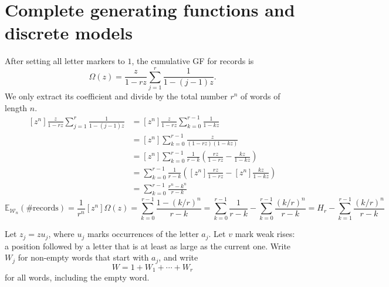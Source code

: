 \section{Complete generating functions and discrete models}
After setting all letter markers to $1$, the cumulative GF for records is
\begin{equation*}
    \Omega(z)=\frac{z}{1-rz}\sum_{j=1}^{r}\frac{1}{1-(j-1)z}.
\end{equation*}
We only extract its coefficient and divide by the total number $r^n$ of words of length $n$.
\begin{equation*}
    \begin{aligned}
        [z^{n}] \frac{z}{1 - rz} \sum_{j = 1}^{r} \frac{1}{1 - (j - 1)z}
        &= [z^{n}] \frac{z}{1 - rz} \sum_{k = 0}^{r - 1} \frac{1}{1 - kz} \\
        &= [z^{n}] \sum_{k = 0}^{r - 1} \frac{z}{(1 - rz)(1 - kz)} \\
        &= [z^{n}] \sum_{k = 0}^{r - 1} \frac{1}{r - k} \left(\frac{rz}{1 - rz} - \frac{kz}{1 - kz} \right) \\
        &= \sum_{k = 0}^{r - 1} \frac{1}{r - k} \left([z^{n}] \frac{rz}{1 - rz} - [z^{n}] \frac{kz}{1 - kz} \right) \\
        &= \sum_{k = 0}^{r - 1} \frac{r^{n} - k^{n}}{r - k}
    \end{aligned}
\end{equation*}
\begin{equation*}
    \mathbb{E}_{\mathcal{W}_{n}}(\#\text{records})
    = \frac{1}{r^n}[z^n]\Omega(z)
    = \sum_{k = 0}^{r - 1} \frac{1 - (k/r)^{n}}{r - k}
    = \sum_{k = 0}^{r - 1} \frac{1}{r - k} - \sum_{k = 0}^{r - 1} \frac{(k/r)^{n}}{r - k}
    = H_{r} - \sum_{k = 1}^{r - 1} \frac{(k/r)^{n}}{r - k}
\end{equation*}


Let $z_j=zu_j$, where $u_j$ marks occurrences of the letter $a_j$. Let $v$ mark weak rises:
a position followed by a letter that is at least as large as the current one. Write $W_j$ for
non-empty words that start with $a_j$, and write
\begin{equation*}
    W = 1 + W_1+\cdots+W_r
\end{equation*}
for all words, including the empty word.

